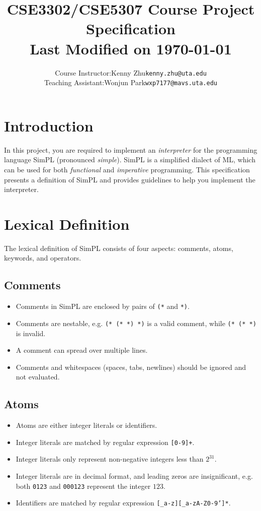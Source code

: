 \documentclass{article}
\title{
  \textbf{CSE3302/CSE5307 Course Project Specification} \\
  {\normalsize Last Modified on \today}}
\author{
  \normalsize
  \begin{tabular}{rcl}
    Course Instructor: & Kenny Zhu & \texttt{kenny.zhu@uta.edu} \\
    Teaching Assistant: & Wonjun Park & \texttt{wxp7177@mavs.uta.edu} \\
  \end{tabular}
}
\begin{document}
\maketitle



\section{Introduction}

In this project, you are required to implement an \emph{interpreter} for the
programming language SimPL (pronounced \emph{simple}).  SimPL is a simplified
dialect of ML, which can be used for both \emph{functional} and
\emph{imperative} programming.  This specification presents a definition of
SimPL and provides guidelines to help you implement the interpreter.

\section{Lexical Definition}

The lexical definition of SimPL consists of four aspects: comments, atoms, keywords, and operators.

\subsection{Comments}

\begin{itemize}
  \item Comments in SimPL are enclosed by pairs of \texttt{(*} and \texttt{*)}.
  \item Comments are nestable, e.g. \texttt{(*  (*  *)  *)} is a valid comment, while \texttt{(*  (*  *)} is invalid.
  \item A comment can spread over multiple lines.
  \item Comments and whitespaces (spaces, tabs, newlines) should be ignored and not evaluated.
\end{itemize}

\subsection{Atoms}

\begin{itemize}
  \item Atoms are either integer literals or identifiers.
  \item Integer literals are matched by regular expression \texttt{[0-9]+}.
  \item Integer literals only represent non-negative integers less than $2^{31}$.
  \item Integer literals are in decimal format, and leading zeros are insignificant, e.g. both \texttt{0123} and \texttt{000123} represent the integer $123$.
  \item Identifiers are matched by regular expression \texttt{[\_a-z][\_a-zA-Z0-9']*}.
\end{itemize}
\end{document}
